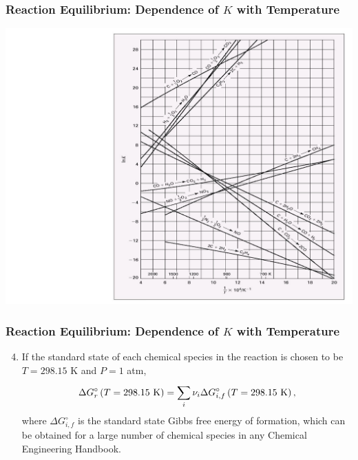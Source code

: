 \documentclass[10pt,compress,unknownkeysallowed]{beamer}
\begin{document}
\begin{frame}
  \frametitle{Reaction Equilibrium:  Dependence of $K$ with Temperature } 
     \begin{center}
          \includegraphics[width=.95\columnwidth,height=0.65\columnwidth,clip]{./../Pics/ChemicalReactions_EquilConstPlotb} 
     \end{center} 

\end{frame}
\begin{frame}
  \frametitle{Reaction Equilibrium:  Dependence of $K$ with Temperature } 

      \begin{enumerate} \setcounter{enumi}{3} 
         \item<1-> If the standard state of each chemical species in the reaction is chosen to be $T=298.15$ K and $P= 1$ atm,
         \begin{displaymath}
              \Delta G_{r}^{\circ} \left(T=298.15\text{ K}\right) = \summation[\nu_{i}\Delta G_{i,f}^{\circ}\left(T=298.15\text{ K}\right)]{i}{},
         \end{displaymath}
         where $\Delta G_{i,f}^{\circ}$ is the standard state Gibbs free energy of formation, which can be obtained for a large number of chemical species in any Chemical Engineering Handbook.
      \end{enumerate}

\end{frame}
\end{document}
